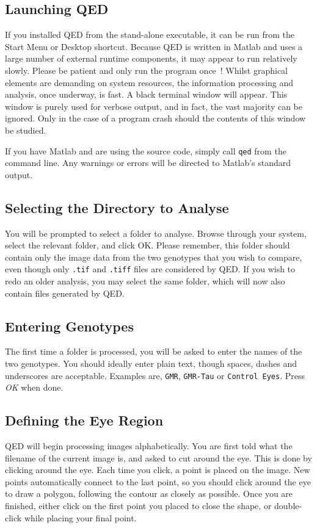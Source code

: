 \documentclass[a4paper,11pt]{article}
\begin{document}
\subsection{Launching QED}
If you installed QED from the stand-alone executable, it can be run from the Start Menu or Desktop shortcut. Because QED is written in Matlab and uses a large number of external runtime components, it may appear to run relatively slowly. Please be patient and only run the program once~! Whilst graphical elements are demanding on system resources, the information processing and analysis, once underway, is fast. A black terminal window will appear. This window is purely used for verbose output, and in fact, the vast majority can be ignored. Only in the case of a program crash should the contents of this window be studied.

\noindent If you have Matlab and are using the source code, simply call \texttt{qed} from the command line. Any warnings or errors will be directed to Matlab's standard output.


\subsection{Selecting the Directory to Analyse}
You will be prompted to select a folder to analyse. Browse through your system, select the relevant folder, and click OK. Please remember, this folder should contain only the image data from the two genotypes that you wish to compare, even though only \texttt{.tif} and \texttt{.tiff} files are considered by QED. If you wish to redo an older analysis, you may select the same folder, which will now also contain files generated by QED.

\subsection{Entering Genotypes}
The first time a folder is processed, you will be asked to enter the names of the two genotypes. You should ideally enter plain text, though spaces, dashes and underscores are acceptable. Examples are, \texttt{GMR}, \texttt{GMR-Tau} or \texttt{Control Eyes}. Press \textit{OK} when done.

\subsection{Defining the Eye Region}
QED will begin processing images alphabetically. You are first told what the filename of the current image is, and asked to cut around the eye. This is done by clicking around the eye. Each time you click, a point is placed on the image. New points automatically connect to the last point, so you should click around the eye to draw a polygon, following the contour as closely as possible. Once you are finished, either click on the first point you placed to close the shape, or double-click while placing your final point. 
\end{document}
